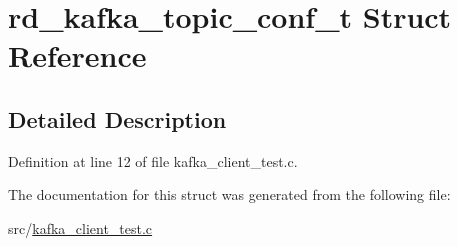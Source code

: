 \hypertarget{structrd__kafka__topic__conf__t}{\section{rd\-\_\-kafka\-\_\-topic\-\_\-conf\-\_\-t \-Struct \-Reference}
\label{structrd__kafka__topic__conf__t}
}


\subsection{\-Detailed \-Description}


\-Definition at line 12 of file kafka\-\_\-client\-\_\-test.\-c.



\-The documentation for this struct was generated from the following file\-:\begin{DoxyCompactItemize}
\item 
src/\hyperlink{kafka__client__test_8c}{kafka\-\_\-client\-\_\-test.\-c}\end{DoxyCompactItemize}
